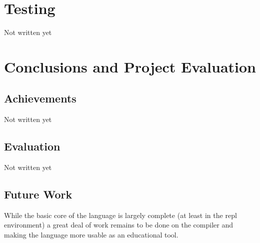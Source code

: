\documentclass[12pt, a4paper]{report}
\begin{document}
\chapter{Testing}

Not written yet

\chapter{Conclusions and Project Evaluation}

\section{Achievements}
Not written yet

\section{Evaluation}
Not written yet

\section{Future Work}
While the basic core of the language is largely complete (at least in the repl environment) a great
deal of work remains to be done on the compiler and making the language more usable as an educational
tool.
\end{document}
